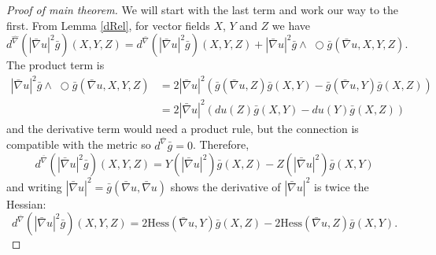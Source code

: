 \documentclass{amsart}
\newcommand{\wtimes}{\wedge \!\!\!\!\!\!\!\!\;\bigcirc}
\begin{document}
\begin{proof}[Proof of main theorem]
We will start with the last term and work our way to the first.  
From Lemma \ref{dRel}, for vector fields $X$, $Y$ and $Z$ we have
\[
d^{\hat{\nabla}}(|\bar{\nabla}u|^2\bar{g})(X,Y,Z) = d^{\bar{\nabla}}(|\bar{\nabla}u|^2\bar{g})(X,Y,Z) + |\bar{\nabla}u|^2\bar{g} \wtimes \bar{g}(\bar{\nabla}u,X,Y,Z).
\]
The product term is
\begin{equation}
\label{NormTerm}
\begin{aligned}
|\bar{\nabla}u|^2\bar{g} \wtimes \bar{g}(\bar{\nabla}u,X,Y,Z)
&= 2|\bar{\nabla}u|^2(\bar{g}(\bar{\nabla}u, Z)\bar{g}(X,Y) - \bar{g}(\bar{\nabla}u,Y)\bar{g}(X,Z)) \\
&= 2|\bar{\nabla}u|^2(du(Z)\bar{g}(X,Y) - du(Y)\bar{g}(X,Z))
\end{aligned}
\end{equation}
and the derivative term would need a product rule, but the connection is compatible with the metric so $d^{\bar{\nabla}}\bar{g} = 0$. 
Therefore, 
\[
d^{\bar{\nabla}}(|\bar{\nabla} u|^2\bar{g})(X,Y,Z)
= Y(|\bar{\nabla} u |^2)\bar{g}(X,Z) - Z(|\bar{\nabla}u|^2)\bar{g}(X,Y)
\]
and writing $|\bar{\nabla}u|^2 = \bar{g}(\bar{\nabla}u,\bar{\nabla}u)$ shows the derivative of $|\bar{\nabla}u|^2$ is twice the Hessian: 
\begin{equation}
\label{DerNorm}
d^{\bar{\nabla}}(|\bar{\nabla} u|^2\bar{g})(X,Y,Z)
= 2\mathrm{Hess}(\bar{\nabla}u,Y)\bar{g}(X,Z) - 2\mathrm{Hess}(\bar{\nabla}u,Z)\bar{g}(X,Y).
\end{equation}


\end{proof}
\end{document}
